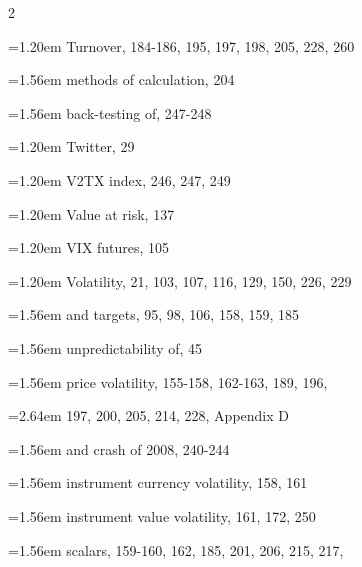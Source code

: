 {\begin{multicols}{2}
\par \noindent\hangindent=1.20em\hspace*{0.00em} Turnover, 184-186, 195, 197, 198, 205, 228, 260
\par \noindent\hangindent=1.56em\hspace*{0.36em} methods of calculation, 204
\par \noindent\hangindent=1.56em\hspace*{0.36em} back-testing of, 247-248
\par \noindent\hangindent=1.20em\hspace*{0.00em} Twitter, 29
\par \noindent\hangindent=1.20em\hspace*{0.00em} V2TX index, 246, 247, 249
\par \noindent\hangindent=1.20em\hspace*{0.00em} Value at risk, 137
\par \noindent\hangindent=1.20em\hspace*{0.00em} VIX futures, 105
\par \noindent\hangindent=1.20em\hspace*{0.00em} Volatility, 21, 103, 107, 116, 129, 150, 226, 229
\par \noindent\hangindent=1.56em\hspace*{0.36em} and targets, 95, 98, 106, 158, 159, 185
\par \noindent\hangindent=1.56em\hspace*{0.36em} unpredictability of, 45
\par \noindent\hangindent=1.56em\hspace*{0.36em} price volatility, 155-158, 162-163, 189, 196,
\par \noindent\hangindent=2.64em\hspace*{1.44em} 197, 200, 205, 214, 228, Appendix D
\par \noindent\hangindent=1.56em\hspace*{0.36em} and crash of 2008, 240-244
\par \noindent\hangindent=1.56em\hspace*{0.36em} instrument currency volatility, 158, 161
\par \noindent\hangindent=1.56em\hspace*{0.36em} instrument value volatility, 161, 172, 250
\par \noindent\hangindent=1.56em\hspace*{0.36em} scalars, 159-160, 162, 185, 201, 206, 215, 217,

\end{multicols}}
